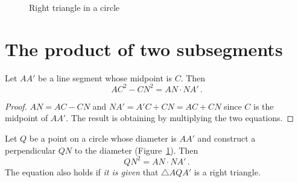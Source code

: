 \begin{figure}[b]
\begin{minipage}{.50\textwidth}
\begin{center}
\caption{Right triangle in a circle}\label{f.circle-besant}
\end{center}
\end{minipage}
\end{figure}


\section{The product of two subsegments}

\begin{theorem}\label{thm.dividing}
Let $AA'$ be a line segment whose midpoint is $C$. Then 
\[
AC^2-CN^2=AN\cdot NA'\,.
\]
\end{theorem}

\begin{center}
\end{center}

\begin{proof}
$AN=AC-CN$ and $NA'=A'C+CN=AC+CN$ since $C$ is the midpoint of $AA'$. The result is obtaining by multiplying the two equations.\hqed
\end{proof}


\begin{theorem}\label{thm.alt-hypo}
Let $Q$ be a point on a circle whose diameter is $AA'$ and construct a perpendicular $QN$ to the diameter (Figure~\ref{f.circle-besant}). Then
\[
QN^2=AN\cdot NA'\,.
\]
The equation also holds if \emph{it is given} that $\triangle AQA'$ is a right triangle.
\end{theorem}

